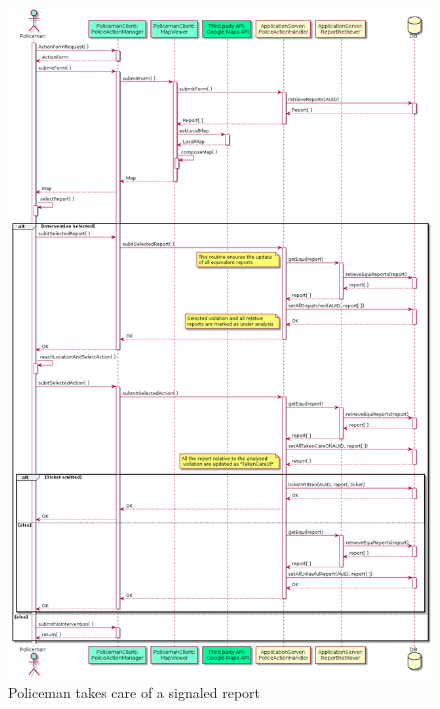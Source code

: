 \begin{figure}[H]
	\centering
	\includegraphics[width=\textwidth]{Images/seqDiag_PolicemanAct}
	\caption{Policeman takes care of a signaled report}
\end{figure}


